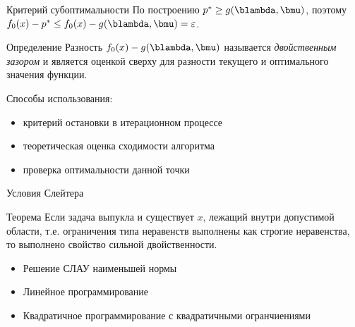 \documentclass[12pt]{beamer}
\begin{document}
\begin{frame}{Критерий субоптимальности}
По построению $p^* \geq g(\blambda, \bmu)$, поэтому $f_0(x) - p^* \leq f_0(x) - g(\blambda, \bmu) = \varepsilon$.
\begin{block}{Определение}
Разность $f_0(x) - g(\blambda, \bmu)$ называется \emph{двойственным зазором} и является оценкой сверху для разности текущего и оптимального значения функции.
\end{block}
Способы использования:
\begin{itemize}
\item критерий остановки в итерационном процессе
\item теоретическая оценка сходимости алгоритма
\item проверка оптимальности данной точки
\end{itemize}
\end{frame}

\begin{frame}{Условия Слейтера}
\begin{block}{Теорема}
Если задача выпукла и существует $x$, лежащий внутри допустимой области, т.е. ограничения типа неравенств выполнены как строгие неравенства, то выполнено свойство сильной двойственности.
\end{block}

\begin{itemize}
\item Решение СЛАУ наименьшей нормы
\item Линейное программирование
\item Квадратичное программирование с квадратичными огранчиениями
\end{itemize}
\end{frame}
\end{document}
